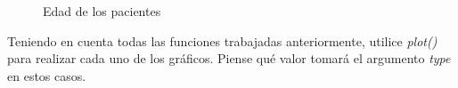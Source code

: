 \documentclass{prob}
\begin{document}
\begin{problema}
\begin{parte}
\begin{figure}[!ht]
    \centering
    
    \caption{Edad de los pacientes}
    \label{fig:hist3}
\end{figure}	

	Teniendo en cuenta todas las funciones trabajadas anteriormente, utilice \textit{plot()} para realizar cada uno de los gráficos. Piense qué valor tomará el argumento \textit{type} en estos casos.

	\end{parte}
	
	\end{problema}
	
\end{document}
